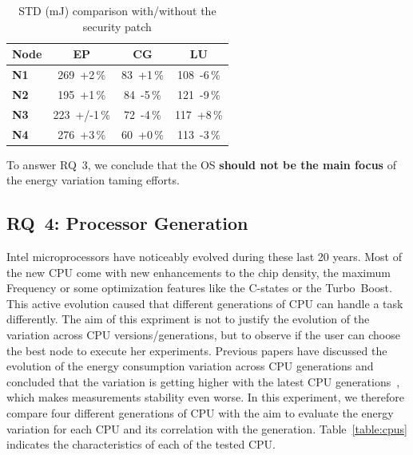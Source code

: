 \begin{table}[h!]
    \centering
    \caption{STD (mJ) comparison with/without the security patch}
    \label{table:meltdown}
    \small
    \begin{tabular}{|l|c|c|c|}
        \hline
        \textbf{Node} & \textbf{\sf EP} & \textbf{\sf CG} & \textbf{\sf LU} \\
        \hline
        \hline
        \textbf{N1}   & 269~+2\,\%      & 83~+1\,\%       & 108~-6\,\%      \\
        \hline
        \textbf{N2}   & 195~+1\,\%      & 84~-5\,\%       & 121~-9\,\%      \\
        \hline
        \textbf{N3}   & 223~+/-1\,\%    & 72~-4\,\%       & 117~+8\,\%      \\
        \hline
        \textbf{N4}   & 276~+3\,\%      & 60~+0\,\%       & 113~-3\,\%      \\
        \hline
    \end{tabular}
\end{table}

\begin{mdframed}[skipabove=\topsep,skipbelow=\topsep]
    To answer \textsc{RQ~3}, we conclude that the OS \textbf{should not be the main focus} of the energy variation taming efforts.
\end{mdframed}

\subsection{\textsc{RQ}~4: Processor Generation}
Intel microprocessors have noticeably evolved during these last 20 years.
Most of the new CPU come with new enhancements to the chip density, the maximum Frequency or some optimization features like the C-states or the Turbo~Boost.
This active evolution caused that different generations of CPU can handle a task differently.
The aim of this expriment is not to justify the evolution of the variation across CPU versions/generations, but to observe if the user can choose the best node to execute her experiments.
Previous papers have discussed the evolution of the energy consumption variation across CPU generations and concluded that the variation is getting higher with the latest CPU generations~\cite{wang_experimental_nodate,marathe_empirical_2017_m}, which makes measurements stability even worse.
In this experiment, we therefore compare four different generations of CPU with the aim to evaluate the energy variation for each CPU and its correlation with the generation.
Table~\ref{table:cpus} indicates the characteristics of each of the tested CPU.

